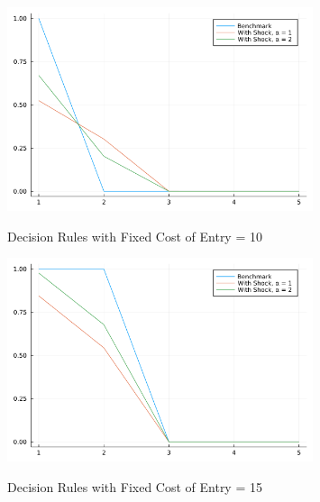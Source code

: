 \documentclass[12pt]{article}
\begin{document}
\begin{figure}[!htbp]
	\centering
	\caption{Decision Rules with Fixed Cost of Entry = 10}
	\includegraphics[width=0.8\textwidth]{decision_rules_c_f_10.png}
	\label{figure1}
\end{figure}

\begin{figure}[!htbp]
	\centering
	\caption{Decision Rules with Fixed Cost of Entry = 15}
	\includegraphics[width=0.8\textwidth]{decision_rules_c_f_15.png}
	\label{figure2}
\end{figure}
\end{document}
